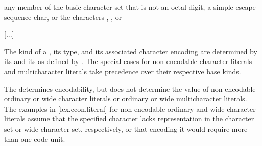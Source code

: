 \documentclass{wg21}
\begin{document}
\begin{bnf}

\br
\textnormal{any member of the basic  character set that is not an} octal-digit\textnormal{, a} simple-escape-sequence-char\textnormal{, or the characters , , or }
\end{bnf}

[...]

\pnum
The kind of a ,
its type, and its associated character encoding
are determined by
its  and its 
as defined by .
The special cases for
non-encodable character literals and multicharacter literals
take precedence over their respective base kinds.
\begin{note}
    The 
    determines encodability,
    but does not determine the value of
    non-encodable ordinary or wide character literals or
    ordinary or wide multicharacter literals.
    The examples in [lex.ccon.literal]
    for non-encodable ordinary and wide character literals assume that
    the specified character lacks representation in
    the  character set or  wide-character set, respectively, or
    that encoding it would require more than one code unit.
\end{note}
\end{document}
